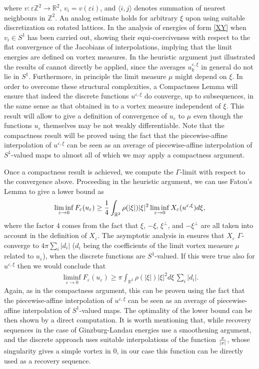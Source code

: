 \documentclass[11pt]{article}
\def\e{\varepsilon}
\begin{document}
where $v\colon\e\mathbb Z^2\to \mathbb R^2$, $v_i=v(\e i)$, and $\langle i,j\rangle$ denotes summation of nearest neighbours in $\mathbb Z^2$. An analog estimate holds for arbitrary $\xi$ upon using suitable discretization on rotated lattices. In \cite{AC} the analysis of energies of form \eqref{XY} when $v_i\in S^1$ has been carried out, showing their equi-coerciveness with respect to the flat convergence of the Jacobians of interpolations, implying that the limit energies are defined on vortex measures. In the heuristic argument just illustrated the results of \cite{AC} cannot directly be applied, since the averages $u^{\e,\xi}_k$ in general do not lie in $S^1$. Furthermore, in principle the limit measure $\mu$ might depend on $\xi$. In order to overcome these structural complexities, a Compactness Lemma will ensure that indeed the discrete functions $u^{\e,\xi}$ do converge, up to subsequences, in the same sense as that obtained in \cite{AC} to a vortex measure independent of $\xi$. This result will allow to give a definition of convergence of $u_\e$ to $\mu$ even though the functions $u_\e$ themselves may be not weakly differentiable. Note that the compactness result will be proved using the fact that the piecewise-affine interpolation of $u^{\e,\xi}$ can be seen as an average of piecewise-affine interpolation of $S^1$-valued maps to almost all of which we may apply a compactness argument.
 
Once a compactness result is achieved, we compute the $\Gamma$-limit with respect to the convergence above. Proceeding in the heuristic argument, we can use Fatou's Lemma to give a lower bound as 
\begin{eqnarray*}
\liminf_{\e\to 0} F_\e(u_\e) \ge {1\over 4} \int_{\mathbb R^2}{\rho(|\xi|)|\xi|^2}  \liminf_{\e\to0} X_\e(u^{\e,\xi})d\xi, \end{eqnarray*}
where the factor $4$ comes from the fact that  $\xi$,   $-\xi$, $\xi^\perp$, and  $-\xi^\perp$ are all taken into account in the definition of $X_\e$. The asymptotic analysis in \cite{AC} ensures that $X_\e$ $\Gamma$-converge to $4\pi \sum_i|d_i|$ ($d_i$ being the coefficients of the limit vortex measure $\mu$ related to $u_\e$), when the discrete functions are $S^1$-valued. If this were true also for $u^{\e,\xi}$ then we would conclude that
\begin{eqnarray*}
\liminf_{\e\to 0} F_\e(u_\e) \ge {\pi} \int_{\mathbb R^2}{\rho(|\xi|)|\xi|^2}d\xi \, \sum_i|d_i|.
\end{eqnarray*}
Again, as in the compactness argument, this can be proven using the fact that the piecewise-affine interpolation of $u^{\e,\xi}$ can be seen as an average of piecewise-affine interpolation of $S^1$-valued maps.
The optimality of the lower bound can be then shown by a direct computation. It is worth mentioning that, while recovery sequences in the case of Ginzburg-Landau energies use a smoothening argument, and the discrete approach uses suitable interpolations of the function  ${x\over|x|}$, whose singularity gives a simple vortex in $0$, in our case this function can be directly used as a recovery sequence. 
 
\end{document}
